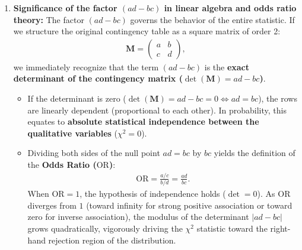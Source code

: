 \begin{solproblema}
\begin{enumerate}
		\item \textbf{Significance of the factor $(ad - bc)$ in linear algebra and odds ratio theory:}
		The factor $(ad - bc)$ governs the behavior of the entire statistic. If we structure the original contingency table as a square matrix of order 2:
		\begin{align}
			\mathbf{M} = \begin{pmatrix} a & b \\ c & d \end{pmatrix},
		\end{align}
		we immediately recognize that the term $(ad - bc)$ is the \textbf{exact determinant of the contingency matrix ($\det(\mathbf{M}) = ad - bc$)}.
		\begin{itemize}
			\item If the determinant is zero ($\det(\mathbf{M}) = ad - bc = 0 \iff ad = bc$), the rows are linearly dependent (proportional to each other). In probability, this equates to \textbf{absolute statistical independence between the qualitative variables} ($\chi^2 = 0$).
			\item Dividing both sides of the null point $ad = bc$ by $bc$ yields the definition of the \textbf{Odds Ratio ($\text{OR}$)}:
			\begin{align}
				\text{OR} = \frac{a / c}{b / d} = \frac{ad}{bc}.
			\end{align}
			When $\text{OR} = 1$, the hypothesis of independence holds ($\det = 0$). As $\text{OR}$ diverges from $1$ (toward infinity for strong positive association or toward zero for inverse association), the modulus of the determinant $|ad - bc|$ grows quadratically, vigorously driving the $\chi^2$ statistic toward the right-hand rejection region of the distribution.
		\end{itemize}
	\end{enumerate}
\end{solproblema}

